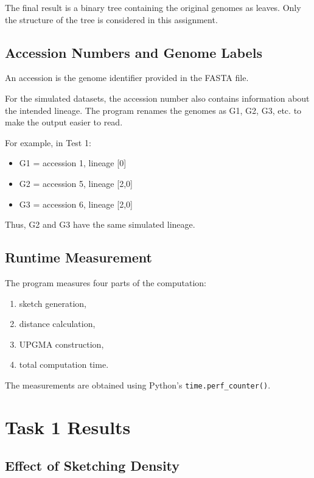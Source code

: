 \documentclass[11pt,a4paper]{article}
\begin{document}
The final result is a binary tree containing the original genomes as leaves.
Only the structure of the tree is considered in this assignment.

\subsection{Accession Numbers and Genome Labels}

An accession is the genome identifier provided in the FASTA file.

For the simulated datasets, the accession number also contains information
about the intended lineage. The program renames the genomes as G1, G2, G3,
etc. to make the output easier to read.

For example, in Test 1:

\begin{itemize}
    \item G1 = accession 1, lineage [0]
    \item G2 = accession 5, lineage [2,0]
    \item G3 = accession 6, lineage [2,0]
\end{itemize}

Thus, G2 and G3 have the same simulated lineage.

\subsection{Runtime Measurement}

The program measures four parts of the computation:

\begin{enumerate}
    \item sketch generation,
    \item distance calculation,
    \item UPGMA construction,
    \item total computation time.
\end{enumerate}

The measurements are obtained using Python's
\texttt{time.perf\_counter()}.


\section{Task 1 Results}

\subsection{Effect of Sketching Density}
\end{document}
